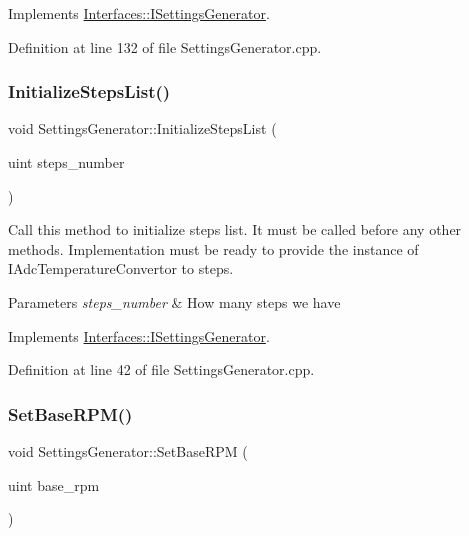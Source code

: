 Implements \hyperlink{class_interfaces_1_1_i_settings_generator_a8de5944be5295009b7407772bc9b1b3b}{Interfaces\+::\+I\+Settings\+Generator}.



Definition at line 132 of file Settings\+Generator.\+cpp.

\mbox{\label{class_settings_generator_a84b81d11cb5f83d4066e73a03acfc143}} 
\subsubsection{\texorpdfstring{Initialize\+Steps\+List()}{InitializeStepsList()}}
{\footnotesize\ttfamily void Settings\+Generator\+::\+Initialize\+Steps\+List (\begin{DoxyParamCaption}\item[{uint}]{steps\+\_\+number }\end{DoxyParamCaption})\hspace{0.3cm}{\ttfamily [virtual]}}



Call this method to initialize steps list. It must be called before any other methods. Implementation must be ready to provide the instance of I\+Adc\+Temperature\+Convertor to steps. 


\begin{DoxyParams}{Parameters}
{\em steps\+\_\+number} & How many steps we have \\
\hline
\end{DoxyParams}


Implements \hyperlink{class_interfaces_1_1_i_settings_generator_a4aa0307e906c003012aad75101072c65}{Interfaces\+::\+I\+Settings\+Generator}.



Definition at line 42 of file Settings\+Generator.\+cpp.

\mbox{\label{class_settings_generator_a1c1960b9021f7081b4c42c4d7c0eda34}} 
\subsubsection{\texorpdfstring{Set\+Base\+R\+P\+M()}{SetBaseRPM()}}
{\footnotesize\ttfamily void Settings\+Generator\+::\+Set\+Base\+R\+PM (\begin{DoxyParamCaption}\item[{uint}]{base\+\_\+rpm }\end{DoxyParamCaption})\hspace{0.3cm}{\ttfamily [virtual]}}




